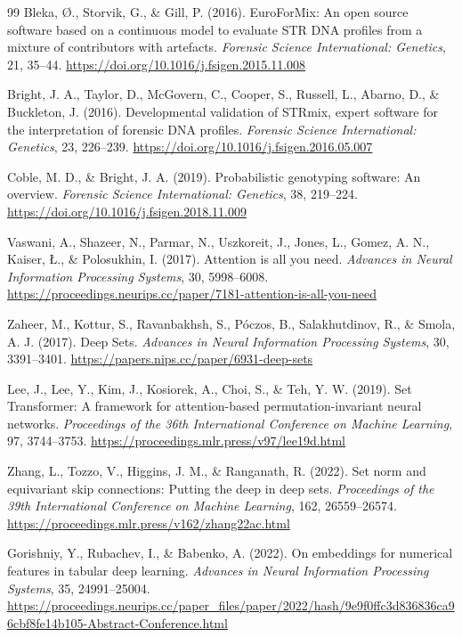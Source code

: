 \documentclass[12pt,a4paper]{article}
\begin{document}
\begin{thebibliography}{99}
Bleka, Ø., Storvik, G., \& Gill, P. (2016).
EuroForMix: An open source software based on a continuous model to evaluate STR DNA profiles from a mixture of contributors with artefacts.
\textit{Forensic Science International: Genetics}, 21, 35--44.
\url{https://doi.org/10.1016/j.fsigen.2015.11.008}

Bright, J. A., Taylor, D., McGovern, C., Cooper, S., Russell, L., Abarno, D., \& Buckleton, J. (2016).
Developmental validation of STRmix, expert software for the interpretation of forensic DNA profiles.
\textit{Forensic Science International: Genetics}, 23, 226--239.
\url{https://doi.org/10.1016/j.fsigen.2016.05.007}

Coble, M. D., \& Bright, J. A. (2019).
Probabilistic genotyping software: An overview.
\textit{Forensic Science International: Genetics}, 38, 219--224.
\url{https://doi.org/10.1016/j.fsigen.2018.11.009}

Vaswani, A., Shazeer, N., Parmar, N., Uszkoreit, J., Jones, L., Gomez, A. N., Kaiser, Ł., \& Polosukhin, I. (2017).
Attention is all you need.
\textit{Advances in Neural Information Processing Systems}, 30, 5998--6008.
\url{https://proceedings.neurips.cc/paper/7181-attention-is-all-you-need}

Zaheer, M., Kottur, S., Ravanbakhsh, S., Póczos, B., Salakhutdinov, R., \& Smola, A. J. (2017).
Deep Sets.
\textit{Advances in Neural Information Processing Systems}, 30, 3391--3401.
\url{https://papers.nips.cc/paper/6931-deep-sets}

Lee, J., Lee, Y., Kim, J., Kosiorek, A., Choi, S., \& Teh, Y. W. (2019).
Set Transformer: A framework for attention-based permutation-invariant neural networks.
\textit{Proceedings of the 36th International Conference on Machine Learning}, 97, 3744--3753.
\url{https://proceedings.mlr.press/v97/lee19d.html}

Zhang, L., Tozzo, V., Higgins, J. M., \& Ranganath, R. (2022).
Set norm and equivariant skip connections: Putting the deep in deep sets.
\textit{Proceedings of the 39th International Conference on Machine Learning}, 162, 26559--26574.
\url{https://proceedings.mlr.press/v162/zhang22ac.html}

Gorishniy, Y., Rubachev, I., \& Babenko, A. (2022).
On embeddings for numerical features in tabular deep learning.
\textit{Advances in Neural Information Processing Systems}, 35, 24991--25004.
\url{https://proceedings.neurips.cc/paper_files/paper/2022/hash/9e9f0ffc3d836836ca96cbf8fe14b105-Abstract-Conference.html}


\end{thebibliography}
\end{document}
